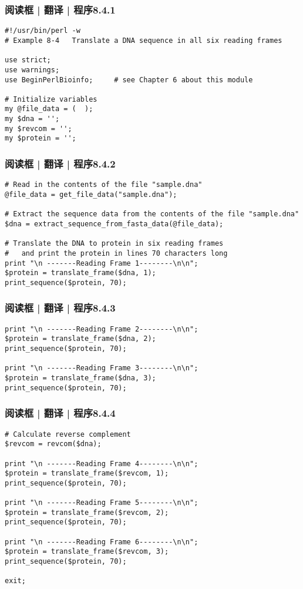\begin{frame}[fragile]
  \frametitle{阅读框 | 翻译 | 程序8.4.1}
\begin{lstlisting}[firstnumber=1]
#!/usr/bin/perl -w
# Example 8-4   Translate a DNA sequence in all six reading frames

use strict;
use warnings;
use BeginPerlBioinfo;     # see Chapter 6 about this module

# Initialize variables
my @file_data = (  );
my $dna = '';
my $revcom = '';
my $protein = '';
\end{lstlisting}
\end{frame}

\begin{frame}[fragile]
  \frametitle{阅读框 | 翻译 | 程序8.4.2}
\begin{lstlisting}[firstnumber=14,basicstyle=\small\tt,numberstyle=\footnotesize]
# Read in the contents of the file "sample.dna"
@file_data = get_file_data("sample.dna");

# Extract the sequence data from the contents of the file "sample.dna"
$dna = extract_sequence_from_fasta_data(@file_data);

# Translate the DNA to protein in six reading frames
#   and print the protein in lines 70 characters long
print "\n -------Reading Frame 1--------\n\n";
$protein = translate_frame($dna, 1);
print_sequence($protein, 70);
\end{lstlisting}
\end{frame}

\begin{frame}[fragile]
  \frametitle{阅读框 | 翻译 | 程序8.4.3}
\begin{lstlisting}[firstnumber=26]
print "\n -------Reading Frame 2--------\n\n";
$protein = translate_frame($dna, 2);
print_sequence($protein, 70);

print "\n -------Reading Frame 3--------\n\n";
$protein = translate_frame($dna, 3);
print_sequence($protein, 70);
\end{lstlisting}
\end{frame}

\begin{frame}[fragile]
  \frametitle{阅读框 | 翻译 | 程序8.4.4}
\begin{lstlisting}[firstnumber=34,basicstyle=\footnotesize\tt,numberstyle=\scriptsize]
# Calculate reverse complement
$revcom = revcom($dna);

print "\n -------Reading Frame 4--------\n\n";
$protein = translate_frame($revcom, 1);
print_sequence($protein, 70);

print "\n -------Reading Frame 5--------\n\n";
$protein = translate_frame($revcom, 2);
print_sequence($protein, 70);

print "\n -------Reading Frame 6--------\n\n";
$protein = translate_frame($revcom, 3);
print_sequence($protein, 70);

exit;
\end{lstlisting}
\end{frame}

